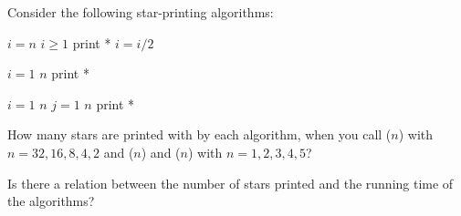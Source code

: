 \documentclass{article}
\begin{document}
\begin{Exercise}
    \noindent
    Consider the following star-printing algorithms:

    \begin{minipage}[t]{.3\textwidth}
        \begin{codebox}
            \li $i = n$
            \li \While $i \geq 1$ \Do
                \li print *
                \li $i = i / 2$
            \End
        \end{codebox}
    \end{minipage}%
    \hfill
    \begin{minipage}[t]{.3\textwidth}
        \begin{codebox}
            \li \For $i = 1$ \To $n$ \Do
                \li print *
            \End
        \end{codebox}
    \end{minipage}%
    \hfill
    \begin{minipage}[t]{.3\textwidth}
        \begin{codebox}
            \li \For $i=1$ \To $n$ \Do
                \li \For $j=1$ \To $n$ \Do
                    \li print *
                \End
            \End
        \end{codebox}
    \end{minipage}

    \Question
    How many stars are printed with by each algorithm, when you call
    ($n$) with $n = 32, 16, 8, 4, 2$ and
    ($n$) and ($n$) with $n = 1, 2, 3, 4,
    5$?

    \Question
    Is there a relation between the number of stars printed and the running time
    of the algorithms?
\end{Exercise}
\end{document}
